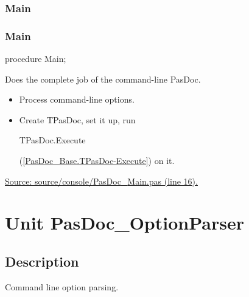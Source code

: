 \documentclass{report}
\newif\ifpdf
\begin{document}
\subsection*{\large{\textbf{Main}}\normalsize\hspace{1ex}\hrulefill}
\else
\subsection*{Main}
\fi
\label{PasDoc_Main-Main}
\begin{list}{}{
\setlength{\itemindent}{0cm}
\setlength{\listparindent}{0cm}
\setlength{\leftmargin}{\evensidemargin}
\addtolength{\leftmargin}{\tmplength}
\settowidth{\labelsep}{X}
\addtolength{\leftmargin}{\labelsep}
\setlength{\labelwidth}{\tmplength}
}
\item[\textbf{Declaration}\hfill]
\ifpdf
\begin{flushleft}
\fi
\begin{ttfamily}
procedure Main;\end{ttfamily}

\ifpdf
\end{flushleft}
\fi

\par
\item[\textbf{Description}]
Does the complete job of the command{-}line PasDoc. \begin{itemize}
\item Process command{-}line options.
\item Create TPasDoc, set it up, run \begin{ttfamily}TPasDoc.Execute\end{ttfamily}(\ref{PasDoc_Base.TPasDoc-Execute}) on it.
\end{itemize}\par
\href{https://github.com/pasdoc/pasdoc/blob/master/source/console/PasDoc_Main.pas#L16}{Source: source/console/PasDoc{\_}Main.pas (line 16).}

\end{list}
\chapter{Unit PasDoc{\_}OptionParser}
\label{PasDoc_OptionParser}
\section{Description}
Command line option parsing.\hfill\vspace*{1ex}
\end{document}
